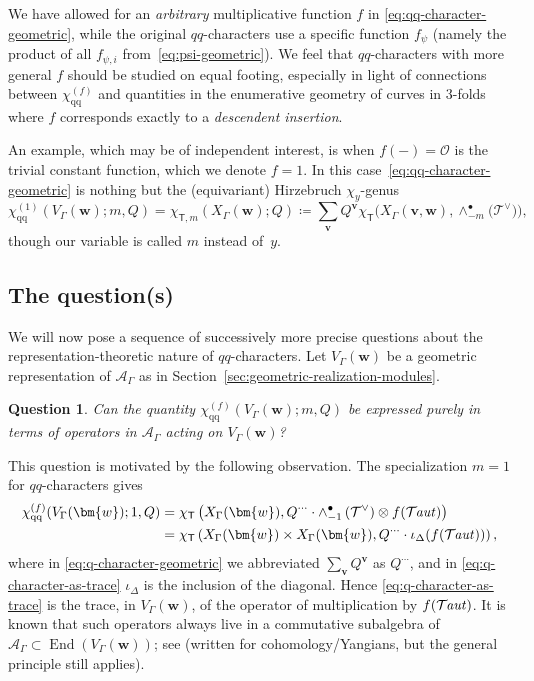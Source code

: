 \documentclass[pdftex]{sigma}%
\numberwithin{equation}{section}
\newtheorem{question}[Theorem]{Question}
\renewcommand{\vec}[1]{\bm{#1}}
\newcommand{\cO}{\mathcal{O}}
\newcommand{\cT}{\mathcal{T}}
\newcommand{\kQ}{Q}
\newcommand{\sT}{\mathsf{T}}
\newcommand{\scA}{\mathscr{A}}
\newcommand{\chiqq}{\chi_{\mathrm{qq}}}
\DeclareMathOperator{\Taut}{\mathcal{T}\mkern-1.5mu{\mathit{aut}}}
\DeclareMathOperator{\End}{End}
\begin{document}
\begin{MyParagraph}
We have allowed for an {\it arbitrary} multiplicative function $f$ in
\eqref{eq:qq-character-geometric}, while the original $qq$-characters
use a specific function $f_{\psi}$ (namely the product of all
$f_{\psi,i}$ from~\eqref{eq:psi-geometric}). We feel that
$qq$-characters with more general $f$ should be studied on equal
footing, especially in light of connections \cite[Section~4.2]{Liu2021}
between $\chiqq^{(f)}$ and quantities in the enumerative geometry of
curves in $3$-folds where $f$ corresponds exactly to a {\it descendent
 insertion}.

An example, which may be of independent interest, is when $f(-) = \cO$
is the trivial constant function, which we denote $f = 1$. In this
case~\eqref{eq:qq-character-geometric} is nothing but the
(equivariant) Hirzebruch $\chi_y$-genus
\[ \chiqq^{(1)}(V_\Gamma(\vec w); m, \kQ) = \chi_{\sT,m}(X_\Gamma(\vec w); \kQ) \coloneqq \sum_{\vec v} \kQ^{\vec v} \chi_{\sT}\big(X_\Gamma(\vec v, \vec w), \wedge_{-m}^\bullet\big(\cT^\vee\big)\big), \]
though our variable is called $m$ instead of~$y$.
\end{MyParagraph}

\subsection{The question(s)}

\begin{MyParagraph}
We will now pose a sequence of successively more precise questions
about the re\-pre\-sen\-ta\-tion-theoretic nature of $qq$-characters. Let
$V_\Gamma(\vec w)$ be a geometric representation of $\scA_\Gamma$ as
in Section~\ref{sec:geometric-realization-modules}.

\begin{question}\label{q:0}
 Can the quantity $\chiqq^{(f)}(V_\Gamma(\vec w); m, \kQ)$ be expressed
 purely in terms of operators in $\scA_\Gamma$ acting on $V_\Gamma(\vec w)$?
\end{question}

This question is motivated by the following observation. The
specialization $m=1$ for $qq$-characters gives
\begin{align}
 \chiqq^{(f)}(V_\Gamma(\vec w); 1, \kQ)
 &= \chi_{\sT}\left(X_\Gamma(\vec w), \kQ^{\cdots} \cdot \wedge_{-1}^\bullet\left(\cT^\vee\right) \otimes f(\Taut)\right) \label{eq:q-character-geometric} \\
 &= \chi_{\sT}\left(X_\Gamma(\vec w) \times X_\Gamma(\vec w), \kQ^{\cdots} \cdot \iota_\Delta(f(\Taut))\right), \label{eq:q-character-as-trace}
\end{align}
where in \eqref{eq:q-character-geometric} we abbreviated $\sum_{\vec
 v} \kQ^{\vec v}$ as $\kQ^{\cdots}$, and in
\eqref{eq:q-character-as-trace} $\iota_\Delta$ is the inclusion of the
diagonal. Hence \eqref{eq:q-character-as-trace} is the trace, in
$V_\Gamma(\vec w)$, of the operator of multiplication by $f(\Taut)$. It is
known that such operators always live in a commutative subalgebra of
$\scA_\Gamma \subset \End(V_\Gamma(\vec w))$; see \cite[Section~5.4]{Maulik2019}
(written for cohomology/Yangians, but the general principle still
applies).
\end{MyParagraph}
\end{document}
